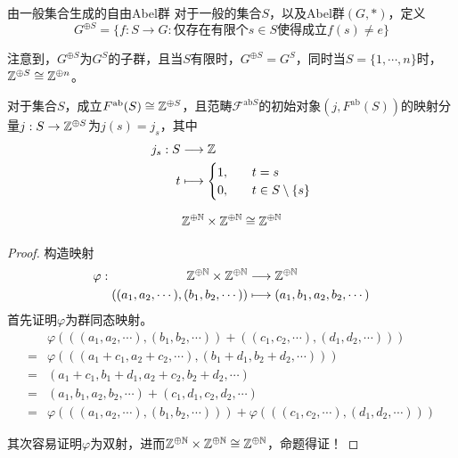\begin{theorem}{由一般集合生成的自由Abel群}
	对于一般的集合$S$，以及Abel群$(G,*)$，定义
	$$
	G^{\oplus S}=\{ f:S\to G:\text{仅存在有限个} s\in S \text{使得成立} f(s)\ne e  \}
	$$
	
	注意到，$G^{\oplus S}$为$G^S$的子群，且当$S$有限时，$G^{\oplus S}=G^S$，同时当$S=\{1,\cdots,n\}$时，$\mathbb{Z}^{\oplus S}\cong\mathbb{Z}^{\oplus n}$。
	
	对于集合$S$，成立$F^{\mathrm{ab}}(S)\cong \mathbb{Z}^{\oplus S}$，且范畴$\mathscr{F}^{\mathrm{ab}S}$的初始对象$(j,F^{\mathrm{ab}}(S))$的映射分量$j:S\to \mathbb{Z}^{\oplus S}$为$j(s)=j_s$，其中
	\begin{align*}
		j_s:\begin{aligned}[t]
			S&\longrightarrow\mathbb{Z}\\
			t&\longmapsto\begin{cases}
				1,\quad & t=s\\
				0,\quad & t\in S\setminus\{s\}
			\end{cases}
		\end{aligned}
	\end{align*}
\end{theorem}

\begin{proposition}
	$$
	\mathbb{Z}^{\oplus \mathbb{N}}\times \mathbb{Z}^{\oplus \mathbb{N}}\cong \mathbb{Z}^{\oplus \mathbb{N}}
	$$
\end{proposition}

\begin{proof}
	构造映射
	\begin{align*}
		\varphi:\begin{aligned}[t]
			\mathbb{Z}^{\oplus \mathbb{N}}\times \mathbb{Z}^{\oplus \mathbb{N}}&\longrightarrow \mathbb{Z}^{\oplus \mathbb{N}}\\
			((a_1,a_2,\cdots),(b_1,b_2,\cdots))&\longmapsto (a_1,b_1,a_2,b_2,\cdots)
		\end{aligned}
	\end{align*}
	首先证明$\varphi$为群同态映射。
	\begin{align*}
		&\varphi(((a_1,a_2,\cdots),(b_1,b_2,\cdots))+((c_1,c_2,\cdots),(d_1,d_2,\cdots)))\\
		=&\varphi(((a_1+c_1,a_2+c_2,\cdots),(b_1+d_1,b_2+d_2,\cdots)))\\
		=&(a_1+c_1,b_1+d_1,a_2+c_2,b_2+d_2,\cdots)\\
		=&(a_1,b_1,a_2,b_2,\cdots)+(c_1,d_1,c_2,d_2,\cdots)\\
		=&\varphi(((a_1,a_2,\cdots),(b_1,b_2,\cdots)))+\varphi(((c_1,c_2,\cdots),(d_1,d_2,\cdots)))
	\end{align*}

	其次容易证明$\varphi$为双射，进而$\mathbb{Z}^{\oplus \mathbb{N}}\times \mathbb{Z}^{\oplus \mathbb{N}}\cong \mathbb{Z}^{\oplus \mathbb{N}}$，命题得证！
\end{proof}

